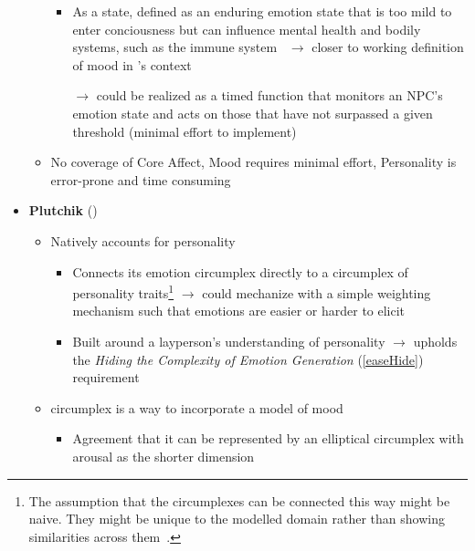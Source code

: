 \begin{itemize}
\begin{itemize}
\begin{itemize}
            \item As a state, defined as an enduring emotion state that is too
            mild to enter conciousness but can influence mental health and
            bodily systems, such as the immune
            system~\citep[p.~21]{izard1991psychology} $\rightarrow$ closer to
            working definition of mood in \progname{}'s context

            \item [$\rightarrow$] could be realized as a timed function that
            monitors an NPC's emotion state and acts on those that have not
            surpassed a given threshold (minimal effort to implement)
        \end{itemize}

        \item No coverage of Core Affect, Mood requires minimal effort,
        Personality is error-prone and time consuming
    \end{itemize}

    \item \textbf{Plutchik} (\good)
    \begin{itemize}
        \item Natively accounts for personality
        \begin{itemize}
            \item Connects its emotion circumplex directly to a
            circumplex of personality traits\footnote{The assumption that
                the circumplexes can be connected this way might be naive. They
                might be unique to the modelled domain rather than showing
                similarities across them~\citep[p.~815]{feldman1995variations}.}
            \citep[p.~27--28]{plutchik1997circumplex} $\rightarrow$ could
            mechanize with a simple weighting mechanism such that emotions are
            easier or harder to elicit

            \item Built around a layperson's understanding of personality
            $\rightarrow$ upholds the \textit{Hiding the Complexity of Emotion
                Generation} (\ref{easeHide}) requirement
        \end{itemize}

        \item circumplex is a way to incorporate a model of mood
        \begin{itemize}
            \item Agreement that it can be represented by an elliptical
            circumplex with arousal as the shorter
            dimension~\citep[p.~806, 812, 814]{feldman1995variations}


\end{itemize}
\end{itemize}
\end{itemize}
